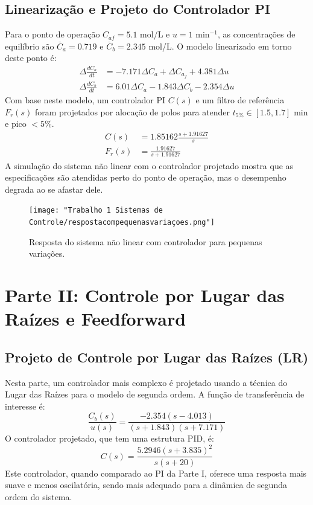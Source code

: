 \documentclass[a4paper,12pt]{report}
\begin{document}
\section{Linearização e Projeto do Controlador PI}
Para o ponto de operação \( C_{af} = 5.1 \) mol/L e \( u = 1 \) min\(^{-1}\), as concentrações de equilíbrio são \( \overline{C}_a = 0.719 \) e \( \overline{C}_b = 2.345 \) mol/L. O modelo linearizado em torno deste ponto é:
\begin{align}
\Delta\frac{dC_a}{dt} &= -7.171 \Delta C_a + \Delta C_{a_f} + 4.381\Delta u \\
\Delta\frac{dC_b}{dt} &= 6.01 \Delta C_a -1.843\Delta C_b - 2.354 \Delta u
\end{align}
Com base neste modelo, um controlador PI \(C(s)\) e um filtro de referência \(F_r(s)\) foram projetados por alocação de polos para atender \(t_{5\%} \in [1.5, 1.7]\) min e pico \(< 5\%\).
\begin{align}
C(s) &= 1.85162 \frac{s + 1.91627}{s} \\
F_r(s) &= \frac{1.91627}{s + 1.91627}
\end{align}
A simulação do sistema não linear com o controlador projetado mostra que as especificações são atendidas perto do ponto de operação, mas o desempenho degrada ao se afastar dele.

\begin{figure}[H]
    \centering
    \texttt{[image: "Trabalho 1 Sistemas de Controle/respostacompequenasvariaçoes.png"]}
    \caption{Resposta do sistema não linear com controlador para pequenas variações.}
\end{figure}

\chapter{Parte II: Controle por Lugar das Raízes e Feedforward}
\section{Projeto de Controle por Lugar das Raízes (LR)}
Nesta parte, um controlador mais complexo é projetado usando a técnica do Lugar das Raízes para o modelo de segunda ordem. A função de transferência de interesse é:
\begin{equation}
\frac{ C_b(s)}{u(s)} = \frac{-2.354(s-4.013)}{(s + 1.843)(s + 7.171)}
\end{equation}
O controlador projetado, que tem uma estrutura PID, é:
\begin{equation}
C(s)=\frac{5.2946(s+3.835)^2}{s(s+20)}  
\end{equation}
Este controlador, quando comparado ao PI da Parte I, oferece uma resposta mais suave e menos oscilatória, sendo mais adequado para a dinâmica de segunda ordem do sistema.
\end{document}

